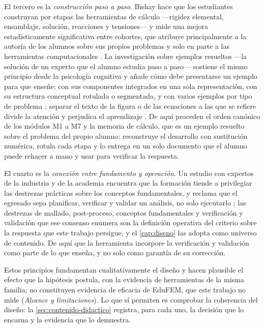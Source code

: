 El tercero es la \emph{construcción paso a paso}. Bishay hace que los estudiantes construyan por etapas las herramientas de cálculo —rigidez elemental, ensamblaje, solución, reacciones y tensiones— y mide una mejora estadísticamente significativa entre cohortes, que atribuye principalmente a la autoría de los alumnos sobre sus propios problemas y solo en parte a las herramientas computacionales \autocite[pp.~4-5, 13, 17]{bishay2020teaching}. La investigación sobre ejemplos resueltos —la solución de un experto que el alumno estudia paso a paso— sostiene el mismo principio desde la psicología cognitiva y añade cómo debe presentarse un ejemplo para que enseñe: con sus componentes integrados en una sola representación, con su estructura conceptual rotulada o segmentada, y con varios ejemplos por tipo de problema \autocite[p.~181]{atkinson2000learning}; separar el texto de la figura o de las ecuaciones a las que se refiere divide la atención y perjudica el aprendizaje \autocite[p.~187]{atkinson2000learning}. De aquí proceden el orden canónico de los módulos M1 a M7 y la memoria de cálculo, que es un ejemplo resuelto sobre el problema del propio alumno: reconstruye el desarrollo con sustitución numérica, rotula cada etapa y lo entrega en un solo documento que el alumno puede rehacer a mano y usar para verificar la respuesta.

El cuarto es la \emph{conexión entre fundamento y operación}. Un estudio con expertos de la industria y de la academia encuentra que la formación tiende a privilegiar las destrezas prácticas sobre los conceptos fundamentales, y reclama que el egresado sepa planificar, verificar y validar un análisis, no solo ejecutarlo \autocite[pp.~1159, 1168]{perezsantiago2023fem}; las destrezas de mallado, post-proceso, conceptos fundamentales y verificación y validación que ese consenso enumera \autocite[p.~1163]{perezsantiago2023fem} son la definición operativa del criterio sobre la respuesta que este trabajo persigue, y el \autoref{cap:diseno} las adopta como universo de contenido. De aquí que la herramienta incorpore la verificación y validación como parte de lo que enseña, y no solo como garantía de su corrección.

Estos principios fundamentan cualitativamente el diseño y hacen plausible el efecto que la hipótesis postula, con la evidencia de herramientas de la misma familia; no constituyen evidencia de eficacia de EduFEM, que este trabajo no mide (\emph{Alcance y limitaciones}). Lo que sí permiten es comprobar la coherencia del diseño: la \autoref{sec:contenido-didactico} registra, para cada uno, la decisión que lo encarna y la evidencia que lo demuestra.

